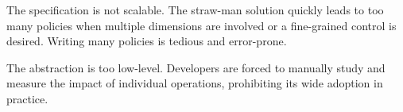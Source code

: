 
The specification is not scalable. The straw-man solution quickly leads to too
many policies when multiple dimensions are involved or a fine-grained control is
desired. Writing many policies is tedious and error-prone.

The abstraction is too low-level. Developers are forced to manually study and
measure the impact of individual operations, prohibiting its wide adoption in
practice.

